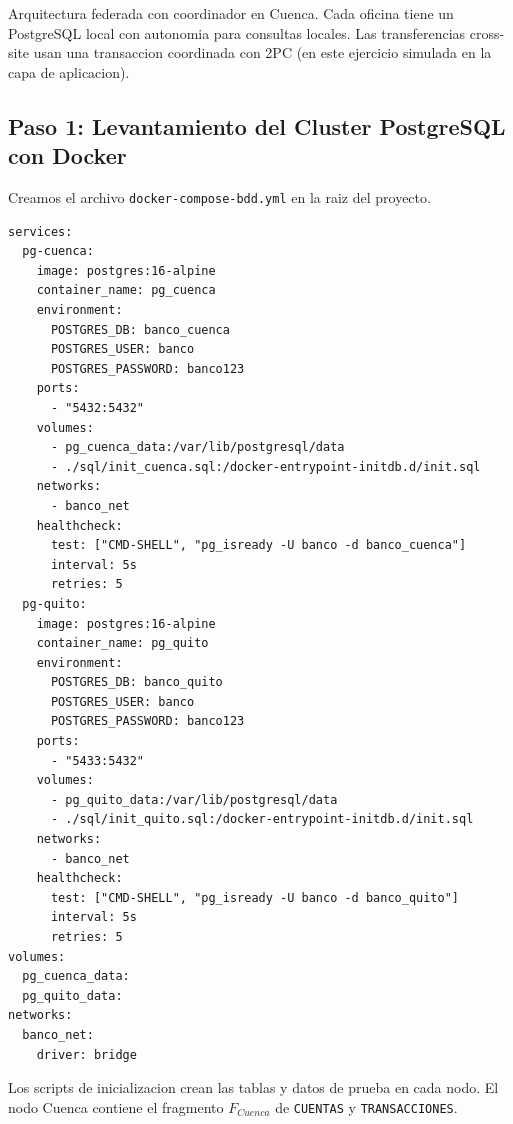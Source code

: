 \documentclass[11pt,a4paper]{article}
\begin{document}
Arquitectura federada con coordinador en Cuenca. Cada oficina tiene un PostgreSQL local con autonomia para consultas locales. Las transferencias cross-site usan una transaccion coordinada con 2PC (en este ejercicio simulada en la capa de aplicacion).

\subsection{Paso 1: Levantamiento del Cluster PostgreSQL con Docker}

Creamos el archivo \texttt{docker-compose-bdd.yml} en la raiz del proyecto.

\begin{lstlisting}[style=YamlStyle,caption={docker-compose-bdd.yml: dos nodos PostgreSQL en contenedores Docker}]
services:
  pg-cuenca:
    image: postgres:16-alpine
    container_name: pg_cuenca
    environment:
      POSTGRES_DB: banco_cuenca
      POSTGRES_USER: banco
      POSTGRES_PASSWORD: banco123
    ports:
      - "5432:5432"
    volumes:
      - pg_cuenca_data:/var/lib/postgresql/data
      - ./sql/init_cuenca.sql:/docker-entrypoint-initdb.d/init.sql
    networks:
      - banco_net
    healthcheck:
      test: ["CMD-SHELL", "pg_isready -U banco -d banco_cuenca"]
      interval: 5s
      retries: 5
  pg-quito:
    image: postgres:16-alpine
    container_name: pg_quito
    environment:
      POSTGRES_DB: banco_quito
      POSTGRES_USER: banco
      POSTGRES_PASSWORD: banco123
    ports:
      - "5433:5432"
    volumes:
      - pg_quito_data:/var/lib/postgresql/data
      - ./sql/init_quito.sql:/docker-entrypoint-initdb.d/init.sql
    networks:
      - banco_net
    healthcheck:
      test: ["CMD-SHELL", "pg_isready -U banco -d banco_quito"]
      interval: 5s
      retries: 5
volumes:
  pg_cuenca_data:
  pg_quito_data:
networks:
  banco_net:
    driver: bridge
\end{lstlisting}

Los scripts de inicializacion crean las tablas y datos de prueba en cada nodo. El nodo Cuenca contiene el fragmento $F_{Cuenca}$ de \texttt{CUENTAS} y \texttt{TRANSACCIONES}.
\end{document}

